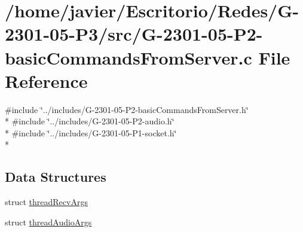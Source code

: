 \hypertarget{_g-2301-05-_p2-basic_commands_from_server_8c}{\section{/home/javier/\-Escritorio/\-Redes/\-G-\/2301-\/05-\/\-P3/src/\-G-\/2301-\/05-\/\-P2-\/basic\-Commands\-From\-Server.c File Reference}
\label{_g-2301-05-_p2-basic_commands_from_server_8c}
}
{\ttfamily \#include \char`\"{}../includes/\-G-\/2301-\/05-\/\-P2-\/basic\-Commands\-From\-Server.\-h\char`\"{}}\\*
{\ttfamily \#include \char`\"{}../includes/\-G-\/2301-\/05-\/\-P2-\/audio.\-h\char`\"{}}\\*
{\ttfamily \#include \char`\"{}../includes/\-G-\/2301-\/05-\/\-P1-\/socket.\-h\char`\"{}}\\*
\subsection*{Data Structures}
\begin{DoxyCompactItemize}
\item 
struct \hyperlink{structthread_recv_args}{thread\-Recv\-Args}
\item 
struct \hyperlink{structthread_audio_args}{thread\-Audio\-Args}
\end{DoxyCompactItemize}
